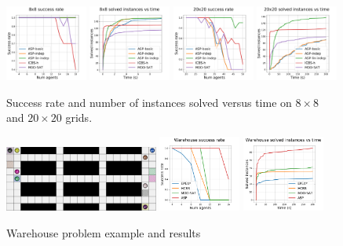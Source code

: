 \begin{figure}
    \includegraphics[width=0.24\textwidth]{graphs/8x8succ.pdf}
    \includegraphics[width=0.24\textwidth]{graphs/8x8runtime.pdf}
    \includegraphics[width=0.24\textwidth]{graphs/20x20succ.pdf}
    \includegraphics[width=0.24\textwidth]{graphs/20x20runtime.pdf}
    \caption{Success rate and number of instances solved versus time on $8\times 8$ and $20\times 20$ grids.}
    
    \label{fig_obs}
\end{figure}

\begin{figure}
    \includegraphics[width=0.45\textwidth]{graphs/warehouse.PNG}
    \includegraphics[width=0.24\textwidth]{graphs/warehousesucc.png}
    \includegraphics[width=0.24\textwidth]{graphs/warehouseruntime.png}
    \caption{Warehouse problem example and results}
    \label{fig_ware}
\end{figure}

